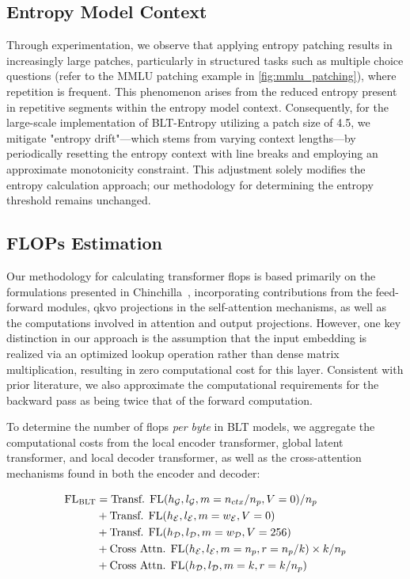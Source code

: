 \subsection{Entropy Model Context}
\label{section:entropy-context}
Through experimentation, we observe that applying entropy patching results in increasingly large patches, particularly in structured tasks such as multiple choice questions (refer to the MMLU patching example in \autoref{fig:mmlu_patching}), where repetition is frequent. This phenomenon arises from the reduced entropy present in repetitive segments within the entropy model context. Consequently, for the large-scale implementation of {\textsc BLT}-Entropy utilizing a patch size of 4.5, we mitigate "entropy drift"—which stems from varying context lengths—by periodically resetting the entropy context with line breaks and employing an approximate monotonicity constraint. This adjustment solely modifies the entropy calculation approach; our methodology for determining the entropy threshold remains unchanged.

\subsection{FLOPs Estimation} 
\label{section:flops}

Our methodology for calculating transformer flops is based primarily on the formulations presented in Chinchilla~\citep{hoffmann2022training}, incorporating contributions from the feed-forward modules, qkvo projections in the self-attention mechanisms, as well as the computations involved in attention and output projections. However, one key distinction in our approach is the assumption that the input embedding is realized via an optimized lookup operation rather than dense matrix multiplication, resulting in zero computational cost for this layer. Consistent with prior literature, we also approximate the computational requirements for the backward pass as being twice that of the forward computation.

To determine the number of flops \textit{per byte} in {\textsc BLT} models, we aggregate the computational costs from the local encoder transformer, global latent transformer, and local decoder transformer, as well as the cross-attention mechanisms found in both the encoder and decoder:

\begin{align}
    \text{FL}_{\text{{\textsc BLT}}} &= \text{Transf. FL}(h_{\mathcal{G}}, l_{\mathcal{G}}, m=n_{ctx}/n_p, V=0) / n_p \\
    &+ \text{Transf. FL}(h_{\mathcal{E}}, l_{\mathcal{E}}, m=w_{\mathcal{E}}, V=0) \\
    &+ \text{Transf. FL}(h_{\mathcal{D}}, l_{\mathcal{D}}, m=w_{\mathcal{D}}, V=256) \\
    &+ \text{Cross Attn. FL}(h_{\mathcal{E}}, l_{\mathcal{E}}, m=n_p, r=n_p/k) \times k/n_p \\
    &+ \text{Cross Attn. FL}(h_{\mathcal{D}}, l_{\mathcal{D}}, m=k, r=k/n_p)
\end{align}

